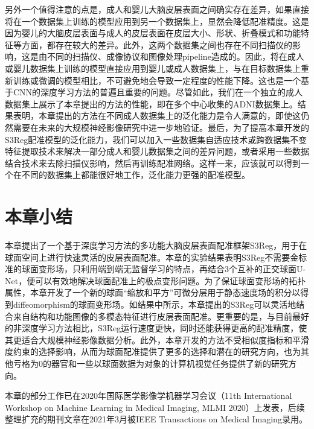 另外一个值得注意的点是，成人和婴儿大脑皮层表面之间确实存在差异，如果直接将在一个数据集上训练的模型应用到另一个数据集上，显然会降低配准精度。这是因为婴儿的大脑皮层表面与成人的皮层表面在皮层大小、形状、折叠模式和功能特征等方面，都存在较大的差异\cite{li2015construction}。此外，这两个数据集之间也存在不同扫描仪的影响，这是由不同的扫描仪、成像协议和图像处理pipeline造成的。因此，将在成人或婴儿数据集上训练的模型直接应用到婴儿或成人数据集上，与在目标数据集上重新训练或微调的模型相比，不可避免地会导致一定程度的性能下降。这也是一个基于CNN的深度学习方法的普遍且重要的问题\cite{shen2017deep}。尽管如此，我们在一个独立的成人数据集上展示了本章提出的方法的性能，即在多个中心收集的ADNI数据集上。结果表明，本章提出的方法在不同成人数据集上的泛化能力是令人满意的，即使这仍然需要在未来的大规模神经影像研究中进一步地验证。最后，为了提高本章开发的S3Reg配准模型的泛化能力，我们可以加入一些数据集自适应技术\cite{he2020self}或跨数据集不变特征提取技术\cite{zhong2020dika}来解决一部分成人和婴儿数据集之间的差异问题，或者采用一些数据结合技术\cite{zhao2019harmonization}来去除扫描仪影响，然后再训练配准网络。这样一来，应该就可以得到一个在不同的数据集上都能很好地工作，泛化能力更强的配准模型。

\section{本章小结}
本章提出了一个基于深度学习方法的多功能大脑皮层表面配准框架S3Reg，用于在球面空间上进行快速灵活的皮层表面配准。本章的实验结果表明S3Reg不需要金标准的球面变形场，只利用端到端无监督学习的特点，再结合3个互补的正交球面U-Net，便可以有效地解决球面配准上的极点变形问题。为了保证球面变形场的拓扑属性，本章开发了一个新的球面“缩放和平方”可微分层用于静态速度场的积分以得到diffeomorphism的球面变形场。如结果中所示，本章提出的S3Reg可以灵活地结合来自结构和功能图像的多模态特征进行皮层表面配准。更重要的是，与目前最好的非深度学习方法相比，S3Reg运行速度更快，同时还能获得更高的配准精度，使其更适合大规模神经影像数据分析。此外，本章开发的方法不受相似度指标和平滑度约束的选择影响，从而为球面配准提供了更多的选择和潜在的研究方向，也为其他亏格为0的器官和一些以球面数据为对象的计算机视觉任务提供了新的研究方向。

%
        {
        }
        {
        本章的部分工作已在2020年国际医学影像学机器学习会议（11th International Workshop on Machine Learning in Medical Imaging, MLMI 2020）上发表，后续整理扩充的期刊文章在2021年3月被IEEE Transactions on Medical Imaging录用。
        }








